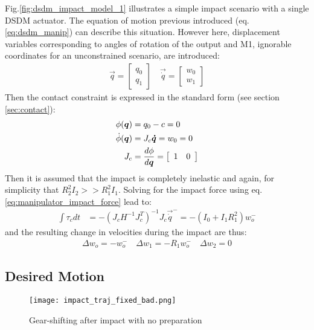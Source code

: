 Fig.\ref{fig:dsdm_impact_model_1} illustrates a simple impact scenario with a single DSDM actuator. The equation of motion previous introduced (eq. \eqref{eq:dsdm_manip}) can describe this situation. However here, displacement variables corresponding to angles of rotation of the output and M1, ignorable coordinates for an unconstrained scenario, are introduced:
%
\begin{align}
\vec{q} = \left[ \begin{array}{c} 	q_0 \\ q_1 \end{array} \right] \quad
\vec{\dot{q}} = \left[ \begin{array}{c} 	w_0 \\ w_1 \end{array} \right]
\label{eq:dsdm_impact_q}
\end{align}
%
Then the contact constraint is expressed in the standard form (see section \ref{sec:contact}):
%
\begin{align}
\phi( \vec{q} )       &= q_0 - c = 0 \\
\dot{\phi}( \vec{q} ) &= J_c\vec{\dot{q}} =  w_0 = 0 \\
J_c                   &= \frac{d \phi}{d\vec{q}} = \left[ \begin{array}{c c} 1 & 0 \end{array} \right]
\label{eq:dsdm_impact_const}
\end{align}
%
Then it is assumed that the impact is completely inelastic and again, for simplicity that $R_2^2 I_2 >> R_1^2 I_1$. Solving for the impact force using eq.\eqref{eq:manipulator_impact_force} lead to:
%
\begin{align}
\int{  \tau_c dt } &= - \left( J_c H^{-1} J_c^T \right)^{-1}  J_c \vec{\dot{q}}^- = -(I_0 + I_1 R_1^2) w_o^-
\label{eq:dsdm_impact_force}
\end{align}
%
and the resulting change in velocities during the impact are thus:
\begin{align}
\Delta w_o  = - w_o^- \quad  \Delta w_1  = - R_1 w_o^-  \quad  \Delta w_2  = 0
\label{eq:dsdm_impact_res}
\end{align}


\subsection{Desired Motion}


\begin{figure}[H]
	\centering
		\texttt{[image: impact\_traj\_fixed\_bad.png]}
	\caption{Gear-shifting after impact with no preparation}
	\label{fig:fixed_bad_impact}
\end{figure}


